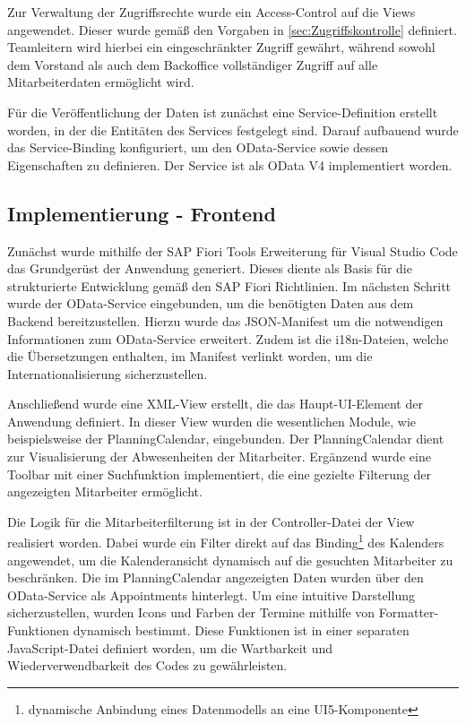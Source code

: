 Zur Verwaltung der Zugriffsrechte wurde ein Access-Control auf die Views angewendet. Dieser wurde gemäß den Vorgaben in \autoref{sec:Zugriffskontrolle} definiert. Teamleitern wird hierbei ein eingeschränkter Zugriff gewährt, während sowohl dem Vorstand als auch dem Backoffice vollständiger Zugriff auf alle Mitarbeiterdaten ermöglicht wird.

Für die Veröffentlichung der Daten ist zunächst eine Service-Definition erstellt worden, in der die Entitäten des Services festgelegt sind. Darauf aufbauend wurde das Service-Binding konfiguriert, um den OData-Service sowie dessen Eigenschaften zu definieren. Der Service ist als OData V4 implementiert worden.
    
\subsection{Implementierung - Frontend}
\label{sec:Implementierung - Frontend}

Zunächst wurde mithilfe der SAP Fiori Tools Erweiterung für Visual Studio Code das Grundgerüst der Anwendung generiert. Dieses diente als Basis für die strukturierte Entwicklung gemäß den SAP Fiori Richtlinien.
Im nächsten Schritt wurde der OData-Service eingebunden, um die benötigten Daten aus dem Backend bereitzustellen. Hierzu wurde das JSON-Manifest um die notwendigen Informationen zum OData-Service erweitert. Zudem ist die i18n-Dateien, welche die Übersetzungen enthalten, im Manifest verlinkt worden, um die Internationalisierung sicherzustellen.

Anschließend wurde eine XML-View erstellt, die das Haupt-UI-Element der Anwendung definiert. In dieser View wurden die wesentlichen Module, wie beispielsweise der PlanningCalendar, eingebunden. Der PlanningCalendar dient zur Visualisierung der Abwesenheiten der Mitarbeiter. Ergänzend wurde eine Toolbar mit einer Suchfunktion implementiert, die eine gezielte Filterung der angezeigten Mitarbeiter ermöglicht.

Die Logik für die Mitarbeiterfilterung ist in der Controller-Datei der View realisiert worden. Dabei wurde ein Filter direkt auf das Binding\footnote{dynamische Anbindung eines Datenmodells an eine UI5-Komponente} des Kalenders angewendet, um die Kalenderansicht dynamisch auf die gesuchten Mitarbeiter zu beschränken.
Die im PlanningCalendar angezeigten Daten wurden über den OData-Service als Appointments hinterlegt. Um eine intuitive Darstellung sicherzustellen, wurden Icons und Farben der Termine mithilfe von Formatter-Funktionen dynamisch bestimmt. Diese Funktionen ist in einer separaten JavaScript-Datei definiert worden, um die Wartbarkeit und Wiederverwendbarkeit des Codes zu gewährleisten.

